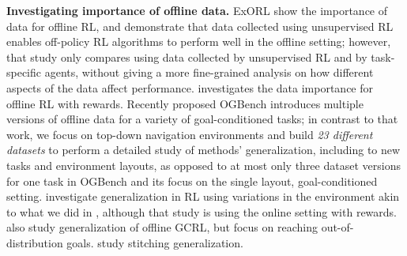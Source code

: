 \pagebreak

\textbf{Investigating importance of offline data.} ExORL \citep{yarats2022don} show the importance of data for offline RL, and demonstrate that data collected using unsupervised RL enables off-policy RL algorithms to perform well in the offline setting; however, that study only compares using data collected by unsupervised RL and by task-specific agents, without giving a more fine-grained analysis on how different aspects of the data affect performance. \citet{buckman2020importance} investigates the data importance for offline RL with rewards.
Recently proposed OGBench \citep{park2024ogbench} introduces multiple versions of offline data for a variety of goal-conditioned tasks; in contrast to that work, we focus on top-down 
navigation environments and build \textit{23 different datasets} to perform a detailed study of methods' generalization, including to new tasks and environment layouts, as opposed to at most only three dataset versions for one task in OGBench and its focus on the single layout, goal-conditioned setting. \citet{cobbe2018quantifying} investigate generalization in RL using variations in the environment akin to what we did in , although that study is using the online setting with rewards. \citet{yang2023essential} also study generalization of offline GCRL, but focus on reaching out-of-distribution goals. \citet{ghugare2024closing} study stitching generalization.